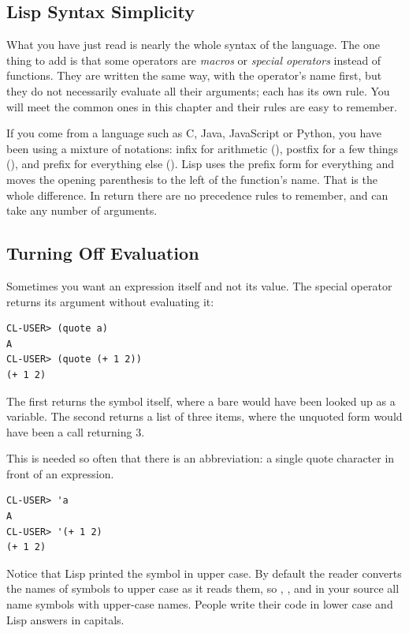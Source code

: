 \subsection{Lisp Syntax Simplicity}

What you have just read is nearly the whole syntax of the language.
The one thing to add is that some operators are \emph{macros} or
\emph{special operators} instead of functions. They are written the
same way, with the operator's name first, but they do not necessarily
evaluate all their arguments; each has its own rule. You will meet
the common ones in this chapter and their rules are easy to remember.

If you come from a language such as C, Java, JavaScript or Python, you
have been using a mixture of notations: infix for arithmetic
(), postfix for a few things (), and prefix for
everything else (). Lisp uses the prefix form for
everything and moves the opening parenthesis to the left of the
function's name. That is the whole difference. In return there are
no precedence rules to remember, and \code{+} can take any number of
arguments.

\subsection{Turning Off Evaluation}
\label{sec:quote}

Sometimes you want an expression itself and not its value. The
special operator  returns its argument without evaluating
it:

\begin{verbatim}
CL-USER> (quote a)
A
CL-USER> (quote (+ 1 2))
(+ 1 2)
\end{verbatim}

The first returns the symbol  itself, where a bare 
would have been looked up as a variable. The second returns a list of
three items, where the unquoted form would have been a call returning
3.

This is needed so often that there is an abbreviation: a single quote
character in front of an expression.

\begin{verbatim}
CL-USER> 'a
A
CL-USER> '(+ 1 2)
(+ 1 2)
\end{verbatim}

Notice that Lisp printed the symbol in upper case. By default the
reader converts the names of symbols to upper case as it reads them,
so , ,  and  in your source
all name symbols with upper-case names. People write their code in
lower case and Lisp answers in capitals.

